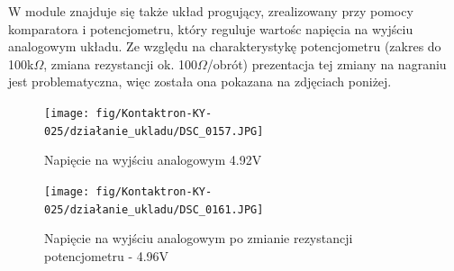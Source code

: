 \documentclass[11pt, a4paper]{article}
\begin{document}
\newpage
W module znajduje się także układ progujący, zrealizowany przy pomocy komparatora i potencjometru, który reguluje wartośc napięcia na wyjściu analogowym układu. Ze względu na charakterystykę potencjometru (zakres do 100k$\Omega$, zmiana rezystancji ok. 100$\Omega$/obrót) prezentacja tej zmiany na nagraniu jest problematyczna, więc została ona pokazana na zdjęciach poniżej.

\vspace{0.2cm}
\begin{figure}[H]
\centering
\texttt{[image: fig/Kontaktron-KY-025/działanie\_ukladu/DSC\_0157.JPG]}
\caption{Napięcie na wyjściu analogowym 4.92V}
\label{fig:sub3}
\end{figure}
\vspace{0.2cm}
\vspace{0.2cm}
\begin{figure}[H]
\centering
\texttt{[image: fig/Kontaktron-KY-025/działanie\_ukladu/DSC\_0161.JPG]}
\caption{Napięcie na wyjściu analogowym po zmianie rezystancji potencjometru - 4.96V}
\label{fig:sub3}
\end{figure}
\vspace{0.2cm}

\printbibliography[heading=bibintoc]
\end{document}
